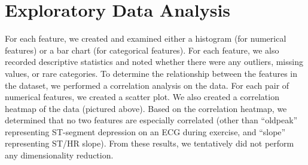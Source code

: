 \section{Exploratory Data Analysis}

For each feature, we created and examined either a histogram (for numerical features) or a bar chart (for categorical features). For each feature, we also recorded descriptive statistics and noted whether there were any outliers, missing values, or rare categories. To determine the relationship between the features in the dataset, we performed a correlation analysis on the data. For each pair of numerical features, we created a scatter plot. We also created a correlation heatmap of the data (pictured above). Based on the correlation heatmap, we determined that no two features are especially correlated (other than ``oldpeak'' representing ST-segment depression on an ECG during exercise, and ``slope'' representing ST/HR slope). From these results, we tentatively did not perform any dimensionality reduction.

